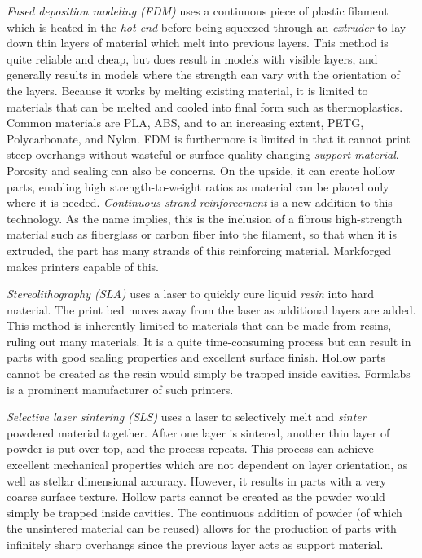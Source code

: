 \documentclass[10pt,letterpaper]{book}
\begin{document}
 	\begin{asparaenum}[a)]
 		\item \textit{Fused deposition modeling (FDM)} uses a continuous piece of plastic filament which is heated in the \textit{hot end} before being squeezed through an \textit{extruder} to lay down thin layers of material which melt into previous layers. This method is quite reliable and cheap, but does result in models with visible layers, and generally results in models where the strength can vary with the orientation of the layers.
 		Because it works by melting existing material, it is limited to materials that can be melted and cooled into final form such as thermoplastics. Common materials are PLA, ABS, and to an increasing extent, PETG, Polycarbonate, and Nylon. FDM is furthermore is limited in that it cannot print steep overhangs without wasteful or surface-quality changing \textit{support material}. Porosity and sealing can also be concerns. On the upside, it can create hollow parts, enabling high strength-to-weight ratios as material can be placed only where it is needed.
 		\textit{Continuous-strand reinforcement} is a new addition to this technology. As the name implies, this is the inclusion of a fibrous high-strength material such as fiberglass or carbon fiber into the filament, so that when it is extruded, the part has many strands of this reinforcing material. Markforged makes printers capable of this.
 		\item \textit{Stereolithography (SLA)} uses a laser to quickly cure liquid \textit{resin} into hard material. The print bed moves away from the laser as additional layers are added. This method is inherently limited to materials that can be made from resins, ruling out many materials. It is a quite time-consuming process but can result in parts with good sealing properties and excellent surface finish. Hollow parts cannot be created as the resin would simply be trapped inside cavities. Formlabs is a prominent manufacturer of such printers.
 		\item \textit{Selective laser sintering (SLS)} uses a laser to selectively melt and \textit{sinter} powdered material together. After one layer is sintered, another thin layer of powder is put over top, and the process repeats. This process can achieve excellent mechanical properties which are not dependent on layer orientation, as well as stellar dimensional accuracy. However, it results in parts with a very coarse surface texture. Hollow parts cannot be created as the powder would simply be trapped inside cavities. The continuous addition of powder (of which the unsintered material can be reused) allows for the production of parts with infinitely sharp overhangs since the previous layer acts as support material.
 	\end{asparaenum}
 	
\end{document}
